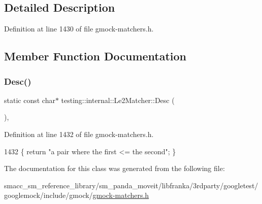 \subsection{Detailed Description}


Definition at line 1430 of file gmock-\/matchers.\+h.



\subsection{Member Function Documentation}
\mbox{\label{classtesting_1_1internal_1_1Le2Matcher_a92e2aca3f09bb687895b10c272cb392f}} 
\subsubsection{\texorpdfstring{Desc()}{Desc()}}
{\footnotesize\ttfamily static const char$\ast$ testing\+::internal\+::\+Le2\+Matcher\+::\+Desc (\begin{DoxyParamCaption}{ }\end{DoxyParamCaption})\hspace{0.3cm}{\ttfamily [inline]}, {\ttfamily [static]}}



Definition at line 1432 of file gmock-\/matchers.\+h.


\begin{DoxyCode}
1432 \{ \textcolor{keywordflow}{return} \textcolor{stringliteral}{"a pair where the first <= the second"}; \}
\end{DoxyCode}


The documentation for this class was generated from the following file\+:\begin{DoxyCompactItemize}
\item 
smacc\+\_\+sm\+\_\+reference\+\_\+library/sm\+\_\+panda\+\_\+moveit/libfranka/3rdparty/googletest/googlemock/include/gmock/\hyperlink{gmock-matchers_8h}{gmock-\/matchers.\+h}\end{DoxyCompactItemize}
